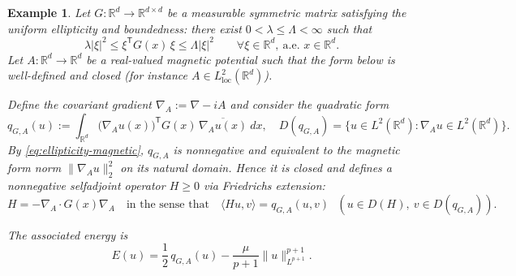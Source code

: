 \documentclass[10pt%
]{amsart}
\numberwithin{equation}{section}
\newtheorem{example}{Example}[section]
\theoremstyle{definition}
\begin{document}
	\begin{example}
		Let $G:\mathbb R^d\to\mathbb R^{d\times d}$ be a measurable symmetric matrix  satisfying the
		uniform ellipticity and boundedness: there exist $0<\lambda\le \Lambda<\infty$ such that
		\begin{equation}\label{eq:ellipticity-magnetic}
			\lambda |\xi|^2 \le \xi^{\mathsf T}G(x)\,\xi \le \Lambda |\xi|^2
			\qquad \forall \xi\in\mathbb R^d,\ \text{a.e. }x\in\mathbb R^d.
		\end{equation}
		Let $A:\mathbb R^d\to\mathbb R^d$ be a real-valued magnetic potential such that the form below is
		well-defined and closed (for instance $A\in L^2_{\mathrm{loc}}(\mathbb R^d)$).
		
		Define the covariant gradient $\nabla_{ A}:=\nabla-i A$ and consider the quadratic form
		\begin{equation}\label{eq:qGA}
			q_{G, A}(u)
			:=
			\int_{\mathbb R^d} \big(\nabla_{A}u(x)\big)^{\mathsf T}
			G(x)\,
			\overline{\nabla_{ A}u(x)}\ dx,
			\quad  D(q_{G,A}) = \{ u \in L^2(\mathbb{R}^d) : \nabla_A u \in L^2(\mathbb{R}^d)\}.
		\end{equation}
		By \eqref{eq:ellipticity-magnetic}, $q_{G,A}$ is nonnegative and equivalent to the magnetic form norm $\|\nabla_Au\|_2^2$ on its natural domain. Hence it is closed and defines a nonnegative selfadjoint operator $H\ge0$ via Friedrichs extension:
		\[
		H=-\nabla_A\cdot G(x)\nabla_A
		\quad\text{in the sense that}\quad
		\langle Hu,v\rangle = q_{G, A}(u,v)\ \ \ (u\in D(H),\ v\in D(q_{G, A})).
		\]
       
The associated energy is
\[
E(u)=\frac12\,q_{G,A}(u)-\frac{\mu}{p+1}\|u\|_{L^{p+1}}^{p+1}.
\]


\end{example}
\end{document}

